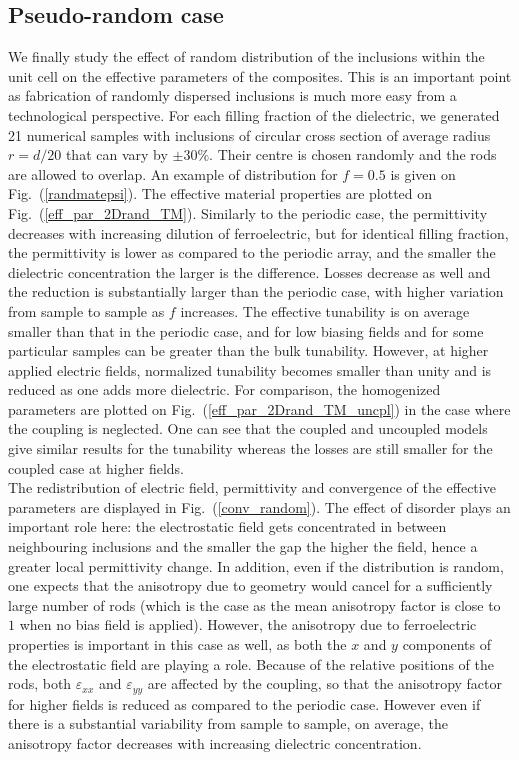 \documentclass[%
 aip,
 amsmath,amssymb,
 reprint,%
linenumbers
]{revtex4-1}
\newcommand{\fig}[1]{Fig.~(\ref{#1})}
\begin{document}
\subsection{Pseudo-random case}



We finally study the effect of random distribution of the inclusions within the unit cell on the effective parameters of the
composites. This is an important point as fabrication of randomly dispersed
inclusions is much more easy from a technological perspective. For each filling fraction of the dielectric,
we generated 21 numerical samples with inclusions of circular cross section of average radius
$r=d/20$ that can vary by $\pm 30\%$. Their centre is chosen randomly and the
rods are allowed to overlap. An example of distribution for $f=0.5$ is given on \fig{randmatepsi}.
The effective material properties are plotted on \fig{eff_par_2Drand_TM}.
Similarly to the periodic case, the permittivity decreases with increasing dilution of
ferroelectric, but for identical filling fraction,
the permittivity is lower as compared to the periodic array, and the smaller the dielectric concentration the larger
is the difference. Losses decrease as well and the reduction is substantially larger
than the periodic case, with higher variation from sample to sample as $f$ increases.
The effective tunability is on average smaller than that in the periodic case, and
for low biasing fields and for some particular samples can be greater than the bulk tunability. However,
at higher applied electric fields, normalized tunability becomes smaller than unity and
is reduced as one adds more dielectric. For comparison, the homogenized
parameters are plotted on \fig{eff_par_2Drand_TM_uncpl} in the case where the coupling is
neglected. One can see that the coupled and uncoupled models give
similar results for the tunability whereas the losses are still smaller for the coupled case
at higher fields.\\
The redistribution of electric field, permittivity and convergence of
the effective parameters are displayed in \fig{conv_random}. The effect of
disorder plays an important role here: the electrostatic field gets concentrated
in between neighbouring inclusions and the smaller the gap the higher the field, hence
a greater local permittivity change. In addition, even if the distribution is
random, one expects that the anisotropy due to geometry would cancel for a sufficiently large number
of rods (which is the case as the mean anisotropy factor is close to $1$ when no
bias field is applied). However, the anisotropy due to ferroelectric properties is
important in this case as well, as both the $x$ and $y$ components of the electrostatic field
are playing a role.
Because of the relative positions of the rods, both $\varepsilon_{xx}$ and $\varepsilon_{yy}$ are affected
by the coupling, so that the anisotropy factor for higher fields is reduced as compared to the periodic case.
However even if there is a substantial variability from sample to sample, on average, the anisotropy factor
decreases with increasing dielectric concentration.
\end{document}
